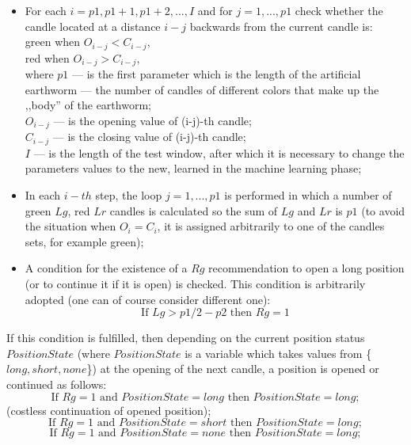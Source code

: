 \documentclass[runningheads,a4paper]{llncs}
\begin{document}
\begin{itemize}
\item For each $i = p1, p1 +1, p1 +2, ..., I$ and for $j = 1, ..., p1$ check whether the candle located at a distance $i-j$ backwards from the current candle is:\\
green when $O_{i-j} <C_{i-j}$, \\
red when $O_{i-j}> C_{i-j}$, \\
where $p1$ --- is the first parameter which is the length of the artificial earthworm --- the number of candles of different colors that make up the ,,body'' of the earthworm; \\
$O_{i-j}$ --- is the opening value of (i-j)-th candle;\\ 
$C_{i-j}$ --- is the closing value of (i-j)-th candle; \\
$I$ --- is the length of the test window, after which it is necessary to change the parameters values to the new, learned in the machine learning phase;\\
\item In each $i-th$ step, the loop $j = 1, ..., p1$ is performed in which a number of green $Lg$, red $Lr$ candles is calculated so the sum of $Lg$ and $Lr$ is $p1$ (to avoid the situation when $O_i = C_i$, it is assigned arbitrarily to one of the candles sets, for example green);
\item A condition for the existence of a $Rg$ recommendation to open a long position (or to continue it if it is open) is checked. This condition is arbitrarily adopted (one can of course consider different one): 
\begin{equation}
\text{If } Lg> p1/2-p2 \text{ then } Rg=1
\end{equation}  
                                                     
\end{itemize}
If this condition is fulfilled, then depending on the current position status $PositionState$ (where $PositionState$ is a variable which takes values from \{$long, short, none$\}) at the opening of the next candle, a position is opened or continued as follows: 
\begin{equation}
\text{If } Rg=1 \text{ and } PositionState =long \text{ then }PositionState =long;
\end{equation}
(costless continuation of opened position);
\begin{equation}
\text{If } Rg=1 \text{ and } PositionState = short \text{ then } PositionState=long;
\end{equation}
\begin{equation}
\text{If } Rg=1 \text{ and } PositionState =none \text{ then } PositionState =long;
\end{equation}
\end{document}
